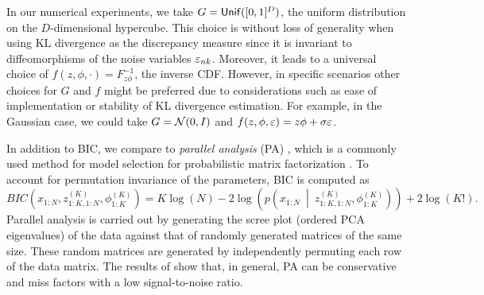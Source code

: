 In our numerical experiments, we take $G = {\sf{Unif}}([0,1]^{D})$, the uniform distribution on the $D$-dimensional hypercube.
This choice is without loss of generality when using KL divergence as the discrepancy measure since it is invariant to diffeomorphisms of the noise variables ${\varepsilon}_{nk}$.
Moreover, it leads to a universal choice of $f(z, \phi, \cdot) = F^{-1}_{z\phi}$, the inverse CDF.
However, in specific scenarios other choices for $G$ and $f$ might be preferred due to considerations such as ease of implementation or stability of KL divergence estimation. 
For example, in the Gaussian case, we could take $G = \mathcal{N}({0}, I)$ and $f(z, \phi, \varepsilon) = z\phi + \sigma \varepsilon$. 

In addition to BIC, we compare \methodname to \emph{parallel analysis} (PA) \citep{Horn_ParallelAnalysis_1965,Buja_RemarksParallelAnalysis_1992}, which is a 
commonly used method for model selection for probabilistic matrix factorization . 
To account for permutation invariance of the parameters, BIC is computed as
\[
BIC\left(x_{1:N},z^{(K)}_{1:K,1:N},\phi^{(K)}_{1:K}\right) = K\log(N) - 2\log\left(p\left(x_{1:N}~\middle|~ z^{(K)}_{1:K,1:N},\phi^{(K)}_{1:K}\right)\right)+2\log(K!).
\]
Parallel analysis is carried out by generating the scree plot (ordered PCA eigenvalues) of the data against that of randomly generated matrices of the same size. These random matrices are generated by independently permuting each row of the data matrix. 
The results of \citet{Dobriban_PA-for-FA_2020} show that, in general, PA can be conservative 
and miss factors with a low signal-to-noise ratio. 

